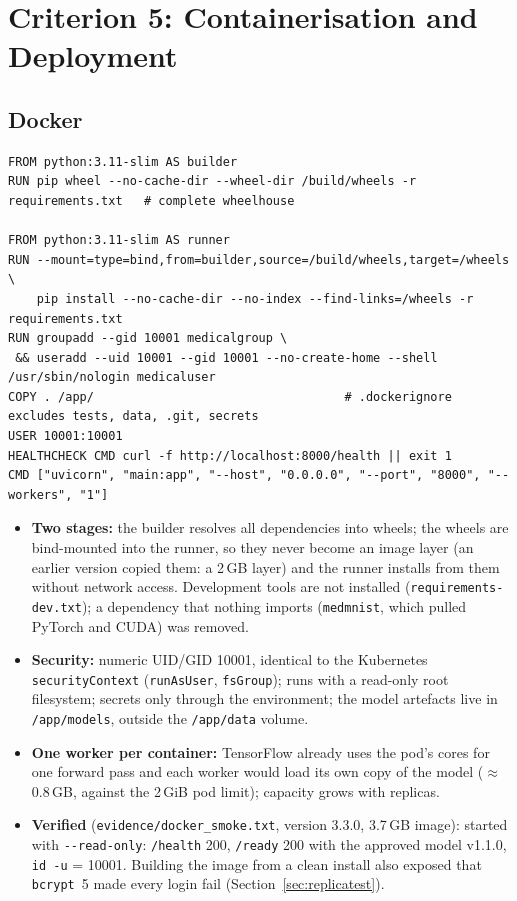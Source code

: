 \documentclass[12pt,a4paper]{article}
\newcommand{\fp}[1]{\nolinkurl{#1}}
\begin{document}
\section{Criterion 5: Containerisation and Deployment}
\label{sec:c5}

\subsection{Docker}

\begin{lstlisting}[language={}, caption={\texttt{Dockerfile} (key lines).}]
FROM python:3.11-slim AS builder
RUN pip wheel --no-cache-dir --wheel-dir /build/wheels -r requirements.txt   # complete wheelhouse

FROM python:3.11-slim AS runner
RUN --mount=type=bind,from=builder,source=/build/wheels,target=/wheels \
    pip install --no-cache-dir --no-index --find-links=/wheels -r requirements.txt
RUN groupadd --gid 10001 medicalgroup \
 && useradd --uid 10001 --gid 10001 --no-create-home --shell /usr/sbin/nologin medicaluser
COPY . /app/                                   # .dockerignore excludes tests, data, .git, secrets
USER 10001:10001
HEALTHCHECK CMD curl -f http://localhost:8000/health || exit 1
CMD ["uvicorn", "main:app", "--host", "0.0.0.0", "--port", "8000", "--workers", "1"]
\end{lstlisting}

\begin{itemize}[leftmargin=*]
    \item \textbf{Two stages:} the builder resolves all dependencies into wheels; the wheels are bind-mounted into the runner, so they never become an image layer
          (an earlier version copied them: a 2\,GB layer) and the runner installs from them without network access. Development tools are not installed
          (\fp{requirements-dev.txt}); a dependency that nothing imports (\texttt{medmnist}, which pulled PyTorch and CUDA) was removed.
    \item \textbf{Security:} numeric UID/GID 10001, identical to the Kubernetes \texttt{securityContext} (\texttt{runAsUser}, \texttt{fsGroup}); runs with a read-only root
          filesystem; secrets only through the environment; the model artefacts live in \texttt{/app/models}, outside the \texttt{/app/data} volume.
    \item \textbf{One worker per container:} TensorFlow already uses the pod's cores for one forward pass and each worker would load its own copy of the model
          ($\approx$0.8\,GB, against the 2\,GiB pod limit); capacity grows with replicas.
    \item \textbf{Verified} (\fp{evidence/docker_smoke.txt}, version 3.3.0, 3.7\,GB image): started with \texttt{-{}-read-only}: \texttt{/health} 200, \texttt{/ready} 200 with the
          approved model v1.1.0, \texttt{id -u} = 10001. Building the image from a clean install also exposed that \texttt{bcrypt}~5 made every login fail (Section~\ref{sec:replicatest}).
\end{itemize}
\end{document}
